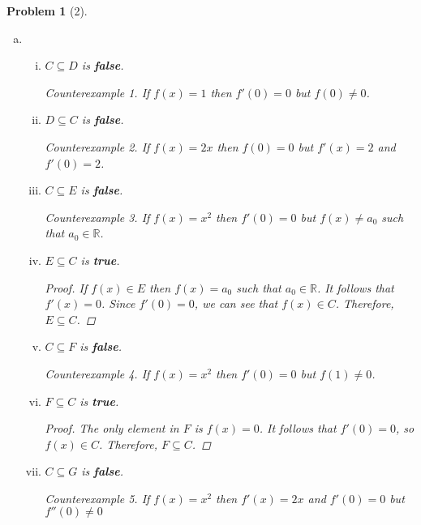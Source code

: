 \documentclass{article}
\theoremstyle{problem}
\newtheorem{prob}{Problem}
\theoremstyle{plain}
\theoremstyle{remark}
\newtheorem{countex}{Counterexample}
\begin{document}
\begin{prob}[2]
\begin{enumerate}[a)]
      \item 
        \begin{enumerate}[i.]
        \item $C \subseteq D$ is \textbf{false}.
          \begin{countex}
            If $f(x) = 1$ then $f'(0) = 0$ but $f(0) \not = 0$.
          \end{countex}
        \item $D \subseteq C$ is \textbf{false}.
          \begin{countex}
            If $f(x) = 2x$ then $f(0) = 0$ but $f'(x) = 2$ and $f'(0) = 2$.
          \end{countex}
        \item $C \subseteq E$ is \textbf{false}.
          \begin{countex}
            If $f(x) = x^2$ then $f'(0) = 0$ but $f(x) \not = a_0$ such that $a_0 \in \mathbb{R}$.
          \end{countex}
        \item $E \subseteq C$ is \textbf{true}.
          \begin{proof}
            If $f(x) \in E$ then $f(x) = a_0$ such that $a_0 \in \mathbb{R}$. It follows that $f'(x) = 0$. Since $f'(0) = 0$, we can see that $f(x) \in C$. Therefore, $E \subseteq C$.
          \end{proof}
        \item $C \subseteq F$ is \textbf{false}.
          \begin{countex}
            If $f(x) = x^2$ then $f'(0) = 0$ but $f(1) \not = 0$.
          \end{countex}
        \item $F \subseteq C$ is \textbf{true}.
          \begin{proof}
            The only element in $F$ is $f(x) = 0$. It follows that $f'(0) = 0$, so $f(x) \in C$. Therefore, $F \subseteq C$.
          \end{proof}
        \item $C \subseteq G$ is \textbf{false}.
          \begin{countex}
            If $f(x) = x^2$ then $f'(x) = 2x$ and $f'(0) = 0$ but $f''(0) \not = 0$
          \end{countex}


\end{enumerate}
\end{enumerate}
\end{prob}
\end{document}
